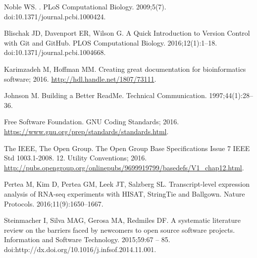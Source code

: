 \documentclass[10pt,letterpaper]{article}
\begin{document}
\begin{thebibliography}{10}
Noble WS.
.
\newblock PLoS Computational Biology. 2009;5(7).
\newblock doi:{10.1371/journal.pcbi.1000424}.

Blischak JD, Davenport ER, Wilson G.
\newblock A Quick Introduction to Version Control with Git and GitHub.
\newblock PLOS Computational Biology. 2016;12(1):1--18.
\newblock doi:{10.1371/journal.pcbi.1004668}.

Karimzadeh M, Hoffman MM. Creating great documentation for bioinformatics
  software; 2016.
\newblock \url{http://hdl.handle.net/1807/73111}.

Johnson M.
\newblock Building a Better ReadMe.
\newblock Technical Communication. 1997;44(1):28--36.

{\relax Free Software Foundation}. GNU Coding Standards; 2016.
\newblock \url{https://www.gnu.org/prep/standards/standards.html}.

{\relax The IEEE}, {\relax The Open Group}. The Open Group Base Specifications
  Issue 7 IEEE Std 1003.1-2008. 12. Utility Conventions; 2016.
\newblock
  \url{http://pubs.opengroup.org/onlinepubs/9699919799/basedefs/V1_chap12.html}.

Pertea M, Kim D, Pertea GM, Leek JT, Salzberg SL.
\newblock Transcript-level expression analysis of RNA-seq experiments with
  HISAT, StringTie and Ballgown.
\newblock Nature Protocols. 2016;11(9):1650--1667.

Steinmacher I, Silva MAG, Gerosa MA, Redmiles DF.
\newblock A systematic literature review on the barriers faced by newcomers to
  open source software projects.
\newblock Information and Software Technology. 2015;59:67 -- 85.
\newblock doi:{http://dx.doi.org/10.1016/j.infsof.2014.11.001}.

\end{thebibliography}
\end{document}
